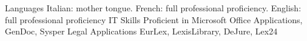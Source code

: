 



\begin{cvskills}
\cvskill
    {Languages} %
    {Italian: mother tongue.
     French: full professional proficiency.
     English: full professional proficiency} %
\cvskill
    {IT Skills} %
    {Proficient in Microsoft Office Applications, GenDoc, Sysper} %
 \cvskill
    {Legal Applications} %
    {EurLex, LexisLibrary, DeJure, Lex24} %

\end{cvskills}
